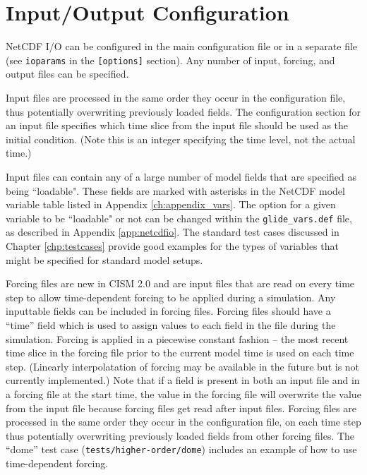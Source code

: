 \section{Input/Output Configuration}
\label{io-config}

NetCDF I/O can be configured in the main configuration file or in a separate file 
(see \texttt{ioparams} in the \texttt{[options]} section). 
Any number of input, forcing, and output files can be specified. 

Input files are processed in the same order they occur in the configuration file, 
thus potentially overwriting previously loaded fields.  The configuration section 
for an input file specifies which time slice from the input file should be used as
the initial condition.  (Note this is an integer specifying the time level, not
the actual time.)

Input files can contain any of a large number of model fields that are specified as being
``loadable". These fields are marked with asterisks in the NetCDF model variable
table listed in Appendix \ref{ch:appendix_vars}. The option for a given variable to be ``loadable" 
or not can be changed within the \texttt{glide\_vars.def} file, as described in Appendix \ref{app:netcdfio}. 
The standard test cases discussed in Chapter \ref{chp:testcases} provide good examples for the types 
of variables that might be specified for standard model setups.    

Forcing files are new in CISM 2.0 and are input files that are read on every 
time step to allow time-dependent
forcing to be applied during a simulation.  Any inputtable fields can be included
in forcing files.  Forcing files should have a ``time'' field which is used to 
assign values to each field in the file during the simulation.  Forcing is applied 
in a piecewise constant fashion -- the most recent time slice in the forcing file prior
to the current model time is used on each time step.  (Linearly interpolatation of
forcing may be available in the future but is not currently implemented.)
Note that if a field is present in both an input file and in a
forcing file at the start time, the value in the forcing file will overwrite the value
from the input file because forcing files get read after input files.
Forcing files are processed in the same order they occur in the configuration file, 
on each time step thus potentially overwriting previously loaded fields from other
forcing files.  The ``dome'' test case (\texttt{tests/higher-order/dome}) includes 
an example of how to use time-dependent forcing.


